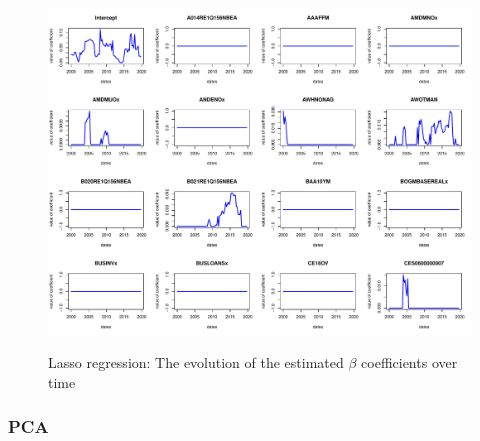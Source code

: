 \documentclass{article}
\begin{document}
\begin{subfigures}
\begin{figure}[hbt!]
\includegraphics[page = 13, width=\textwidth]{plots/lasso_betas}
\label{fig:lasso_betas}
\caption{\label{thirteenth}Lasso regression: The evolution of the estimated $\beta$ coefficients over time}
\centering
\end{figure}

\end{subfigures}

\clearpage

\subsubsection{PCA}
\end{document}
